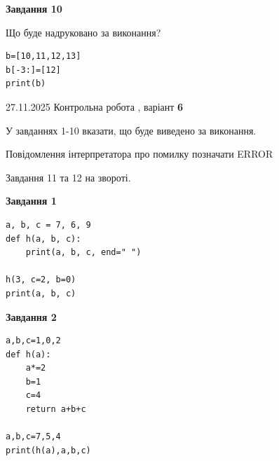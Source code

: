 \documentclass[12pt, ukrainian]{article}
\begin{document}
{{{{{{\begin{minipage}[t]{10.5cm}
\begin{center}
\textbf{Завдання 10}
\end{center}
Що буде надруковано за виконання?\par
\begin{verbatim}
b=[10,11,12,13]
b[-3:]=[12]
print(b)
\end{verbatim}

\end{minipage}

}
\newpage

{{ 27.11.2025 Контрольна робота , варіант  \No \textbf { 6 }\par}}
{

{%



У завданнях 1-10 вказати, що буде виведено за виконання.

Повідомлення інтерпретатора про помилку позначати ERROR

Завдання 11 та 12 на звороті.

\begin{minipage}[t]{7.5cm}

\begin{center}
\textbf{Завдання 1}
\end{center}

\begin{verbatim}
a, b, c = 7, 6, 9
def h(a, b, c):
    print(a, b, c, end=" ")

h(3, c=2, b=0)
print(a, b, c)
\end{verbatim}



\begin{center}
\textbf{Завдання 2}
\end{center}

\begin{verbatim}
a,b,c=1,0,2
def h(a):
    a*=2
    b=1
    c=4
    return a+b+c

a,b,c=7,5,4
print(h(a),a,b,c)
\end{verbatim}




\end{minipage}}}}}}}}
\end{document}
